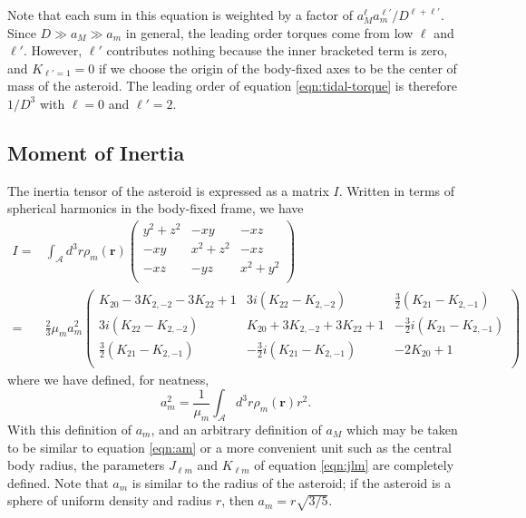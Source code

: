 \documentclass[11pt]{article}
\newcommand{\parens}[1]{\left( #1 \right)}
\begin{document}
Note that each sum in this equation is weighted by a factor of $a_M^\ell a_m^{\ell'}/D^{\ell+\ell'}$. Since $D \gg a_M \gg a_m$ in general, the leading order torques come from low $\ell$ and $\ell'$. However, $\ell'$ contributes nothing because the inner bracketed term is zero, and $K_{\ell' = 1} = 0$ if we choose the origin of the body-fixed axes to be the center of mass of the asteroid. The leading order of equation \ref{eqn:tidal-torque} is therefore $1/D^3$ with $\ell = 0$ and $\ell' = 2$.



\subsection{Moment of Inertia}
The inertia tensor of the asteroid is expressed as a matrix $I$. Written in terms of spherical harmonics in the body-fixed frame, we have
\begin{equation}
\begin{aligned}
I = &\int_\mathcal{A} d^3 r\rho_m(\bm r) \parens{\begin{matrix}
y^2 + z^2 & -xy & -xz \\
-xy & x^2 + z^2 & -xz \\
-xz & -yz & x^2 + y^2 \\
\end{matrix}}\\
= &\frac{2}{3}\mu_m a_m^2\parens{\begin{matrix}
K_{20}-3K_{2,-2}-3K_{22}+1 & 3i \parens{K_{22}-K_{2,-2}} & \frac{3}{2}\parens{K_{21}-K_{2,-1}}\\
3i \parens{K_{22}-K_{2,-2}} & K_{20}+3K_{2,-2}+3K_{22}+1 & -\frac{3}{2}i\parens{K_{21}-K_{2,-1}}\\
\frac{3}{2}\parens{K_{21}-K_{2,-1}} & -\frac{3}{2}i\parens{K_{21}-K_{2,-1}} & -2K_{20}+1\\
\end{matrix}}
\end{aligned}
\label{eqn:moi}
\end{equation}
where we have defined, for neatness,
\begin{equation}
a_m^2=\frac{1}{\mu_m}\int_\mathcal{A} d^3 r \rho_m(\bm r) r^2.
\label{eqn:am}
\end{equation}
With this definition of $a_m$, and an arbitrary definition of $a_M$ which may be taken to be similar to equation \ref{eqn:am} or a more convenient unit such as the central body radius, the parameters $J_{\ell m}$ and $K_{\ell m}$ of equation \ref{eqn:jlm} are completely defined. Note that $a_m$ is similar to the radius of the asteroid; if the asteroid is a sphere of uniform density and radius $r$, then $a_m = r\sqrt{3/5}$.
\end{document}
